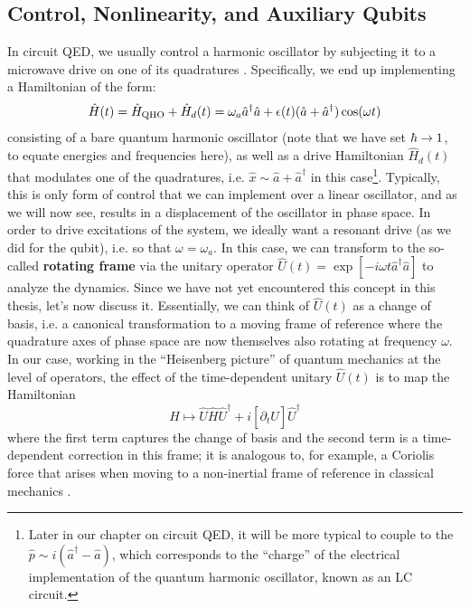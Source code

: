 \subsection{Control, Nonlinearity, and Auxiliary Qubits\label{sec:2_control_nonlinearity_drive}}
In circuit QED, we usually control a harmonic oscillator by subjecting it to a microwave drive on one of its quadratures \cite{manenti2023quantum}. Specifically, we end up implementing a Hamiltonian of the form:
\begin{equation}
    \hat{H}(t) = \hat{H}_{\rm QHO} + \hat{H}_d(t) = \omega_a \hat{a}^\dagger \hat{a} + \epsilon(t)(\hat{a} + \hat{a}^\dagger)\cos(\omega t)
    \label{eq:2_oscillator_drive}
\end{equation}
consisting of a bare quantum harmonic oscillator (note that we have set $\hbar \to 1$, to equate energies and frequencies here), as well as a drive Hamiltonian $\hat{H}_d(t)$ that modulates one of the quadratures, i.e. $\hat{x} \sim \hat{a} + \hat{a}^\dagger$ in this case\footnote{Later in our chapter on circuit QED, it will be more typical to couple to the $\hat{p} \sim i(\hat{a}^\dagger - \hat{a})$, which corresponds to the ``charge'' of the electrical implementation of the quantum harmonic oscillator, known as an LC circuit.}. Typically, this is only form of control that we can implement over a linear oscillator, and as we will now see, results in a displacement of the oscillator in phase space. In order to drive excitations of the system, we ideally want a resonant drive (as we did for the qubit), i.e. so that $\omega = \omega_a$. In this case, we can transform to the so-called \textbf{rotating frame} via the unitary operator $\hat{U}(t) = \exp[-i\omega t\hat{a}^\dagger \hat{a}]$ to analyze the dynamics. Since we have not yet encountered this concept in this thesis, let's now discuss it. Essentially, we can think of $\hat{U}(t)$ as a change of basis, i.e. a canonical transformation to a moving frame of reference where the quadrature axes of phase space are now themselves also rotating at frequency $\omega$. In our case, working in the ``Heisenberg picture'' of quantum mechanics at the level of operators, the effect of the time-dependent unitary $\hat{U}(t)$ is to map the Hamiltonian
\begin{equation}
    \hat{H} \mapsto \hat{U} \hat{H} \hat{U}^\dagger + i[\partial_t \hat{U}]\hat{U}^\dagger
\end{equation}
where the first term captures the change of basis and the second term is a time-dependent correction in this frame; it is analogous to, for example, a Coriolis force that arises when moving to a non-inertial frame of reference in classical mechanics \cite{goldstein-classical-mechanics}. 

